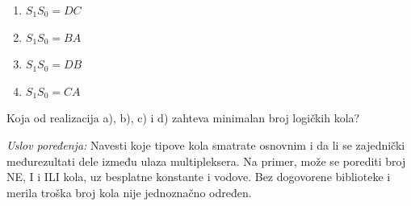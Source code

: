 \documentclass[a4paper,11pt]{article}
\numberwithin{equation}{section} %
\begin{document}
\begin{enumerate}[label=\alph*) , leftmargin=*, itemsep=2pt]
  \item $S_1 S_0 = D C$
  \item $S_1 S_0 = B A$
  \item $S_1 S_0 = D B$
  \item $S_1 S_0 = C A$
\end{enumerate}
\noindent
Koja od realizacija a), b), c) i d) zahteva minimalan broj logičkih kola?

\textit{Uslov poređenja:} Navesti koje tipove kola smatrate osnovnim i da li se zajednički međurezultati dele između ulaza multipleksera. Na primer, može se porediti broj NE, I i ILI kola, uz besplatne konstante i vodove. Bez dogovorene biblioteke i merila troška broj kola nije jednoznačno određen.
\end{document}
